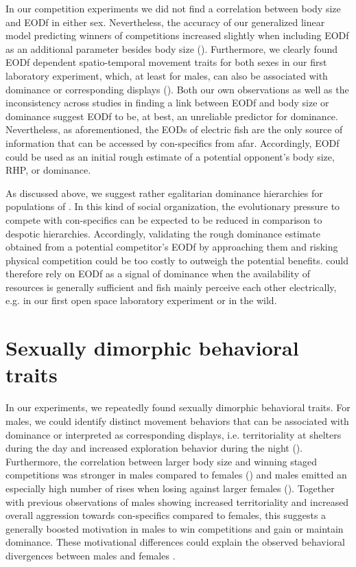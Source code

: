 In our competition experiments we did not find a correlation between body size and EODf in either sex. Nevertheless, the accuracy of our generalized linear model predicting winners of competitions increased slightly when including EODf as an additional parameter besides body size (). Furthermore, we clearly found EODf dependent spatio-temporal movement traits for both sexes in our first laboratory experiment, which, at least for males, can also be associated with dominance or corresponding displays (). Both our own observations as well as the inconsistency across studies in finding a link between EODf and body size or dominance suggest EODf to be, at best, an unreliable predictor for dominance. Nevertheless, as aforementioned, the EODs of electric fish are the only source of information that can be accessed by con-specifics from afar. Accordingly, EODf could be used as an initial rough estimate of a potential opponent's body size, RHP, or dominance. 

As discussed above, we suggest rather egalitarian dominance hierarchies for populations of \lepto{}. In this kind of social organization, the evolutionary pressure to compete with con-specifics can be expected to be reduced in comparison to despotic hierarchies. Accordingly, validating the rough dominance estimate obtained from a potential competitor's EODf by approaching them and risking physical competition could be too costly to outweigh the potential benefits. \lepto{} could therefore rely on EODf as a signal of dominance when the availability of resources is generally sufficient and fish mainly perceive each other electrically, e.g. in our first open space laboratory experiment or in the wild.

\section{Sexually dimorphic behavioral traits}

In our experiments, we repeatedly found sexually dimorphic behavioral traits. For males, we could identify distinct movement behaviors that can be associated with dominance or interpreted as corresponding displays, i.e. territoriality at shelters during the day and increased exploration behavior during the night (). Furthermore, the correlation between larger body size and winning staged competitions was stronger in males compared to females () and males emitted an especially high number of rises when losing against larger females (). Together with previous observations of males showing increased territoriality \citep{Dunlap2002} and increased overall aggression towards con-specifics compared to females, this suggests a generally boosted motivation in males to win competitions and gain or maintain dominance. These motivational differences could explain the observed behavioral divergences between males and females \citep{ArnottElwood2008}.

